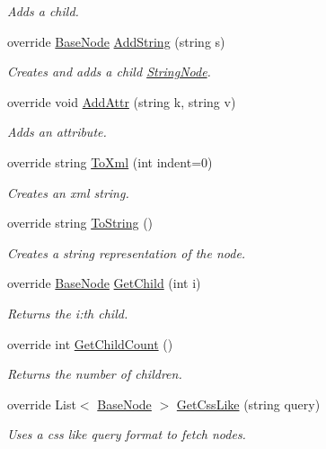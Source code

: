 \begin{DoxyCompactItemize}
\begin{DoxyCompactList}\small\item\em Adds a child. \end{DoxyCompactList}\item 
override \hyperlink{class_x_m_leru_handleru_1_1_base_node}{Base\+Node} \hyperlink{class_x_m_leru_handleru_1_1_node_a74b20c07c1d044392ae7670d58679c90}{Add\+String} (string s)
\begin{DoxyCompactList}\small\item\em Creates and adds a child \hyperlink{class_x_m_leru_handleru_1_1_string_node}{String\+Node}. \end{DoxyCompactList}\item 
override void \hyperlink{class_x_m_leru_handleru_1_1_node_af847932f7294cc39d8a3f6f89062a950}{Add\+Attr} (string k, string v)
\begin{DoxyCompactList}\small\item\em Adds an attribute. \end{DoxyCompactList}\item 
override string \hyperlink{class_x_m_leru_handleru_1_1_node_a29a231aa34d23b491600f13916bcb5de}{To\+Xml} (int indent=0)
\begin{DoxyCompactList}\small\item\em Creates an xml string. \end{DoxyCompactList}\item 
override string \hyperlink{class_x_m_leru_handleru_1_1_node_aa35d6d52814845f0c3f72ccdcdc20d13}{To\+String} ()
\begin{DoxyCompactList}\small\item\em Creates a string representation of the node. \end{DoxyCompactList}\item 
override \hyperlink{class_x_m_leru_handleru_1_1_base_node}{Base\+Node} \hyperlink{class_x_m_leru_handleru_1_1_node_a2e756780a13a8ce3f8b84aaa61a6c0cc}{Get\+Child} (int i)
\begin{DoxyCompactList}\small\item\em Returns the i\+:th child. \end{DoxyCompactList}\item 
override int \hyperlink{class_x_m_leru_handleru_1_1_node_a8d024d88abb37f16a7b46cb5bfdf5345}{Get\+Child\+Count} ()
\begin{DoxyCompactList}\small\item\em Returns the number of children. \end{DoxyCompactList}\item 
override List$<$ \hyperlink{class_x_m_leru_handleru_1_1_base_node}{Base\+Node} $>$ \hyperlink{class_x_m_leru_handleru_1_1_node_a2d2c1b582bd36ee9241763d108bd82e0}{Get\+Css\+Like} (string query)
\begin{DoxyCompactList}\small\item\em Uses a css like query format to fetch nodes. \end{DoxyCompactList}\end{DoxyCompactItemize}
